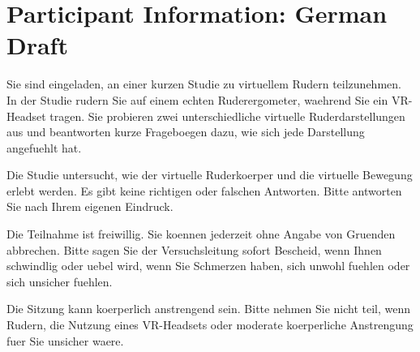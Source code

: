 \section{Participant Information: German Draft}
\label{app:study_materials_participant_information_german}


Sie sind eingeladen, an einer kurzen Studie zu virtuellem Rudern teilzunehmen. In der Studie rudern Sie auf einem echten Ruderergometer, waehrend Sie ein VR-Headset tragen. Sie probieren zwei unterschiedliche virtuelle Ruderdarstellungen aus und beantworten kurze Frageboegen dazu, wie sich jede Darstellung angefuehlt hat.

Die Studie untersucht, wie der virtuelle Ruderkoerper und die virtuelle Bewegung erlebt werden. Es gibt keine richtigen oder falschen Antworten. Bitte antworten Sie nach Ihrem eigenen Eindruck.

Die Teilnahme ist freiwillig. Sie koennen jederzeit ohne Angabe von Gruenden abbrechen. Bitte sagen Sie der Versuchsleitung sofort Bescheid, wenn Ihnen schwindlig oder uebel wird, wenn Sie Schmerzen haben, sich unwohl fuehlen oder sich unsicher fuehlen.

Die Sitzung kann koerperlich anstrengend sein. Bitte nehmen Sie nicht teil, wenn Rudern, die Nutzung eines VR-Headsets oder moderate koerperliche Anstrengung fuer Sie unsicher waere.


